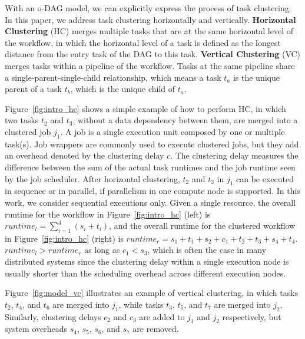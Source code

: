 
With an o-DAG model, we can explicitly express the process of task clustering. In this paper, we address task clustering horizontally and vertically. \textbf{Horizontal Clustering} (HC) merges multiple tasks that are at the same horizontal level of the workflow, in which the horizontal level of a task is defined as the longest distance from the entry task of the DAG to this task. \textbf{Vertical Clustering} (VC) merges tasks within a pipeline of the workflow. Tasks at the same pipeline share a single-parent-single-child relationship, which means a task $t_a$ is the unique parent of a task $t_b$, which is the unique child of $t_a$. 


Figure~\ref{fig:intro_hc} shows a simple example of how to perform HC, in which two tasks $t_2$ and $t_3$, without a data dependency between them, are merged into a clustered job $j_1$. A job is a single execution unit composed by one or multiple task(s). Job wrappers are commonly used to execute clustered jobs, but they add an overhead denoted by the clustering delay $c$. The clustering delay measures the difference between the sum of the actual task runtimes and the job runtime seen by the job scheduler. 
After horizontal clustering, $t_2$ and $t_3$ in $j_1$ can be executed in sequence or in parallel, if parallelism in one compute node is supported. In this work, we consider sequential executions only. Given a single resource, the overall runtime for the workflow in Figure~\ref{fig:intro_hc} (left) is $runtime_l= \sum_{i=1}^{4}(s_i+t_i)$, and the overall runtime for the clustered workflow in Figure~\ref{fig:intro_hc} (right) is $runtime_r=s_1+t_1+s_2+c_1+t_2+t_3+s_4+t_4$.  $runtime_l > runtime_r$ as long as $c_1 < s_3$, which is often the case in many distributed systems since the clustering delay within a single execution node is usually shorter than the scheduling overhead across different execution nodes. 


Figure~\ref{fig:model_vc} illustrates an example of vertical clustering, in which tasks $t_2$, $t_4$, and $t_6$ are merged into $j_1$, while tasks $t_3$, $t_5$, and $t_7$ are merged into $j_2$. Similarly, clustering delays $c_2$ and $c_3$ are added to $j_1$ and $j_2$ respectively, but system overheads $s_4$, $s_5$, $s_6$, and $s_7$ are removed. 







